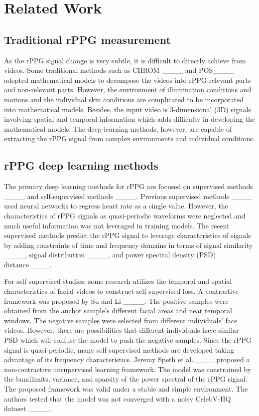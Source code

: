 \section{Related Work}
\label{sec:relatedwork}

\subsection{Traditional rPPG measurement}
As the rPPG signal change is very subtle, it is difficult to directly achieve from videos. Some traditional methods such as CHROM ____ and POS____ adopted mathematical models to decompose the videos into rPPG-relevant parts and non-relevant parts. However, the environment of illumination conditions and motions and the individual skin conditions are complicated to be incorporated into mathematical models. Besides, the input video is 3-dimensional (3D) signals involving spatial and temporal information which adds difficulty in developing the mathematical models. The deep-learning methods, however, are capable of extracting the rPPG signal from complex environments and individual conditions. 

\subsection{rPPG deep learning methods}
The primary deep learning methods for rPPG are focused on supervised methods ____ and self-supervised methods ____. Previous supervised methods ____ used neural networks to regress heart rate as a single value. However, the characteristics of rPPG signals as quasi-periodic waveforms were neglected and much useful information was not leveraged in training models. The recent supervised methods predict the rPPG signal to leverage characteristics of signals by adding constraints of time and frequency domains in terms of signal similarity ____, signal distribution ____, and power spectral density (PSD) distance____.

For self-supervised studies, some research utilizes the temporal and spatial characteristics of facial videos to construct self-supervised loss.  A contrastive framework was proposed by Su and Li ____. The positive samples were obtained from the anchor sample's different facial areas and near temporal windows. The negative samples were selected from different individuals' face videos. However, there are possibilities that different individuals have similar PSD which will confuse the model to push the negative samples. Since the rPPG signal is quasi-periodic, many self-supervised methods are developed taking advantage of its frequency characteristics. Jeremy Speth et al.____ proposed a non-contrastive unsupervised learning framework. The model was constrained by the bandlimits, variance, and sparsity of the power spectral of the rPPG signal. The proposed framework was valid under a stable and simple environment. The authors tested that the model was not converged with a noisy CelebV-HQ dataset ____.

